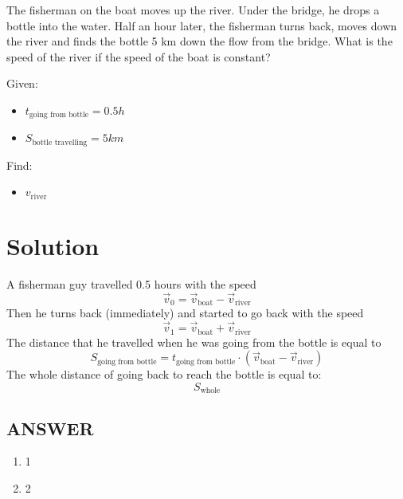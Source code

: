 The fisherman on the boat moves up the river. Under the bridge, he drops a bottle into the water.
Half an hour later, the fisherman turns back, moves down the river and finds the bottle 5 km
down the flow from the bridge. What is the speed of the river if the speed of the boat is constant?

\bigbreak Given: \begin{itemize}
    \item $t_{\text{going from bottle}} = 0.5h$
    \item $S_{\text{bottle travelling}} = 5km$
\end{itemize}

Find: \begin{itemize}
    \item $v_{\text{river}}$
\end{itemize}

\section*{Solution}

A fisherman guy travelled 0.5 hours with the speed $$\Vec{v}_0 = \Vec{v}_{\text{boat}} - \Vec{v}_{\text{river}}$$
Then he turns back (immediately) and started to go back with the speed $$\Vec{v}_1 = \Vec{v}_{\text{boat}} + \Vec{v}_{\text{river}}$$
The distance that he travelled when he was going from the bottle is equal to $$S_{\text{going from bottle}} = t_{\text{going from bottle}} \cdot (\Vec{v}_{\text{boat}} - \Vec{v}_{\text{river}})$$
The whole distance of going back to reach the bottle is equal to:
$$S_{\text{whole}}$$


\vfill
\subsection*{ANSWER}
\begin{enumerate}
    \item 1
    \item 2
\end{enumerate}

